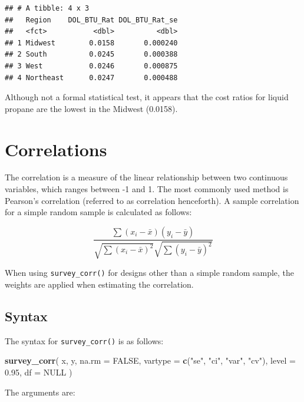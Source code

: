 \documentclass[
]{krantz}
\makeatletter
\newenvironment{Shaded}{\begin{snugshade}}{\end{snugshade}}
\newcommand{\AttributeTok}[1]{\textcolor[rgb]{0.27,0.27,0.27}{#1}}
\newcommand{\ConstantTok}[1]{\textcolor[rgb]{0.37,0.37,0.37}{#1}}
\newcommand{\FloatTok}[1]{\textcolor[rgb]{0.06,0.06,0.06}{#1}}
\newcommand{\FunctionTok}[1]{\textcolor[rgb]{0.27,0.27,0.27}{\textbf{#1}}}
\newcommand{\NormalTok}[1]{#1}
\newcommand{\StringTok}[1]{\textcolor[rgb]{0.5,0.5,0.5}{#1}}
\newenvironment{kframe}{%
\medskip{}
\setlength{\fboxsep}{.8em}
 \def\at@end@of@kframe{}%
 \ifinner\ifhmode%
  \def\at@end@of@kframe{\end{minipage}}%
  \begin{minipage}{\columnwidth}%
 \fi\fi%
 \def\FrameCommand##1{\hskip\@totalleftmargin \hskip-\fboxsep
 \colorbox{shadecolor}{##1}\hskip-\fboxsep
     \hskip-\linewidth \hskip-\@totalleftmargin \hskip\columnwidth}%
 \MakeFramed {\advance\hsize-\width
   \@totalleftmargin\z@ \linewidth\hsize
   \@setminipage}}%
 {\par\unskip\endMakeFramed%
 \at@end@of@kframe}
\renewenvironment{Shaded}{\begin{kframe}}{\end{kframe}}
\makeatother
\begin{document}
\begin{verbatim}
## # A tibble: 4 x 3
##   Region    DOL_BTU_Rat DOL_BTU_Rat_se
##   <fct>           <dbl>          <dbl>
## 1 Midwest        0.0158       0.000240
## 2 South          0.0245       0.000388
## 3 West           0.0246       0.000875
## 4 Northeast      0.0247       0.000488
\end{verbatim}

Although not a formal statistical test, it appears that the cost ratios for liquid propane are the lowest in the Midwest (0.0158).

\hypertarget{correlations}{%
\section{Correlations}\label{correlations}}

The correlation is a measure of the linear relationship between two continuous variables, which ranges between -1 and 1. The most commonly used method is Pearson's correlation (referred to as correlation henceforth). A sample correlation for a simple random sample is calculated as follows:

\[\frac{\sum (x_i-\bar{x})(y_i-\bar{y})}{\sqrt{\sum (x_i-\bar{x})^2} \sqrt{\sum(y_i-\bar{y})^2}} \]

When using \texttt{survey\_corr()} for designs other than a simple random sample, the weights are applied when estimating the correlation.

\hypertarget{syntax-3}{%
\subsection{Syntax}\label{syntax-3}}

The syntax for \texttt{survey\_corr()} is as follows:

\begin{Shaded}
\begin{Highlighting}[]
\FunctionTok{survey\_corr}\NormalTok{(}
\NormalTok{  x,}
\NormalTok{  y,}
  \AttributeTok{na.rm =} \ConstantTok{FALSE}\NormalTok{,}
  \AttributeTok{vartype =} \FunctionTok{c}\NormalTok{(}\StringTok{"se"}\NormalTok{, }\StringTok{"ci"}\NormalTok{, }\StringTok{"var"}\NormalTok{, }\StringTok{"cv"}\NormalTok{),}
  \AttributeTok{level =} \FloatTok{0.95}\NormalTok{,}
  \AttributeTok{df =} \ConstantTok{NULL}
\NormalTok{)}
\end{Highlighting}
\end{Shaded}

The arguments are:
\end{document}
